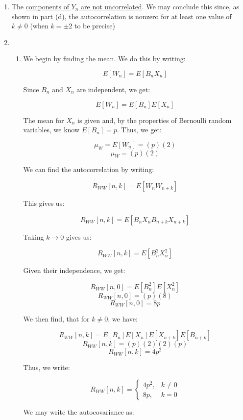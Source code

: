 \begin{enumerate}
\begin{enumerate}
        \item The \underline{components of $Y_n$ are  not uncorrelated}. We may conclude this since, as shown in part (d), the autocorrelation is nonzero for at least one value of $k\neq0$ (when $k=\pm2$ to be precise)

      \item 

        \begin{enumerate}

          \item We begin by finding the mean. We do this by writing:

            $$E[W_n]=E[B_nX_n]$$

            Since $B_n$ and $X_n$ are independent, we get:

            $$E[W_n]=E[B_n]E[X_n]$$

            The mean for $X_n$ is given and, by the properties of Bernoulli random variables, we know $E[B_n]=p$. Thus, we get:

            $$\mu_W=E[W_n]=(p)(2)$$
            $$\boxed{\mu_W=(p)(2)}$$

            We can find the autocorrelation by writing:

            $$R_{WW}[n,k]=E[W_nW_{n+k}]$$

            This gives us:

            $$R_{WW}[n,k]=E[B_nX_nB_{n+k}X_{n+k}]$$

            Taking $k\to0$ gives us:

            $$R_{WW}[n,k]=E[B_n^2X_n^2]$$

            Given their independence, we get:

            $$R_{WW}[n,0]=E[B_n^2]E[X_n^2]$$
            $$R_{WW}[n,0]=(p)(8)$$
            $$R_{WW}[n,0]=8p$$

            We then find, that for $k\neq0$, we have:

            $$R_{WW}[n,k]=E[B_n]E[X_n]E[X_{n+k}]E[B_{n+k}]$$
            $$R_{WW}[n,k]=(p)(2)(2)(p)$$
            $$R_{WW}[n,k]=4p^2$$

            Thus, we write:

            $$\boxed{R_{WW}[n,k]=\left\{\begin{array}{ll} 4p^2, & k\neq0\\ 8p, & k=0\end{array}}$$

            We may write the autocovariance as:


\end{enumerate}
\end{enumerate}
\end{enumerate}

